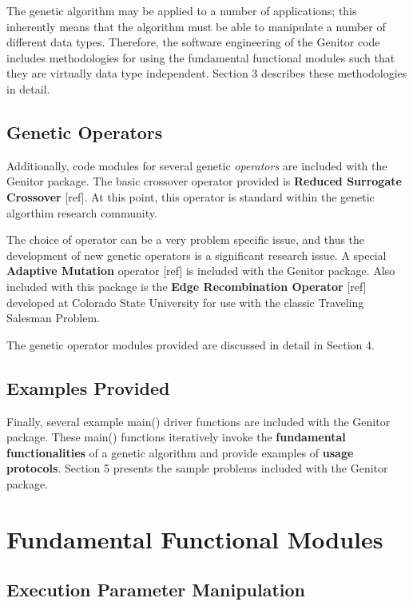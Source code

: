 The genetic algorithm may be applied to a number of applications;
this inherently means that the algorithm must be able to manipulate
a number of different data types.  Therefore, the software engineering
of the Genitor code includes methodologies for using the fundamental
functional modules such that they are virtually data type independent.
Section 3 describes these methodologies in detail.


\subsection{Genetic Operators}

Additionally, code modules for several genetic {\it operators} are
included with the Genitor package.  The basic crossover operator
provided is {\bf Reduced Surrogate Crossover} [ref].  
At this point, this operator is standard within the genetic algorthim
research community.  

The choice of operator can be a very problem specific issue, and thus
the development of new genetic operators is a significant research issue.
A special {\bf Adaptive Mutation} operator [ref] is included with the Genitor
package.  Also included with this package is the {\bf Edge 
Recombination Operator} [ref] developed at Colorado State University 
for use with the classic Traveling Salesman Problem.

The genetic operator modules provided are discussed in detail in Section 4.


\subsection{Examples Provided}
Finally, several example main() driver functions are included with
the Genitor package.  These main() functions iteratively invoke the
{\bf fundamental functionalities} of a genetic algorithm and provide
examples of {\bf usage protocols}.  Section 5 presents the sample
problems included with the Genitor package.

\newpage


\section{Fundamental Functional Modules}

\subsection{Execution Parameter Manipulation}

